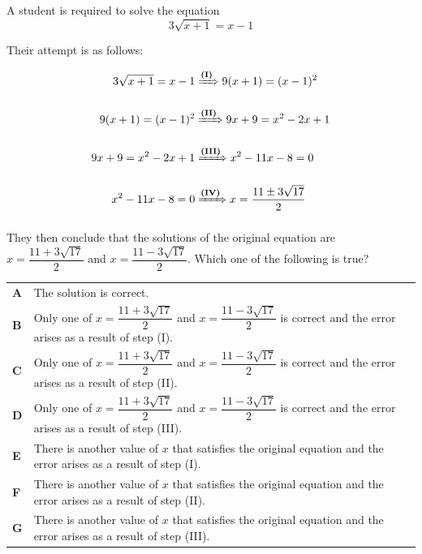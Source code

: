 \documentclass[11pt,a4paper]{article}
\begin{document}
\begin{enumerate}[label=\textbf{\arabic*.},leftmargin=*,itemsep=0pt,start=4]
\questionitem[Algebra]
A student is required to solve the equation \[ 3\sqrt{x+1}=x-1 \]

Their attempt is as follows:

\[ \begin{aligned} 3\sqrt{x+1}=x-1 &\xRightarrow{\textbf{(I)}} 9(x+1)=(x-1)^2\\[10pt] 9(x+1)=(x-1)^2 &\xRightarrow{\textbf{(II)}} 9x+9=x^2-2x+1\\[10pt] 9x+9=x^2-2x+1 &\xRightarrow{\textbf{(III)}} x^2-11x-8=0\\[10pt] x^2-11x-8=0 &\xRightarrow{\textbf{(IV)}} x=\dfrac{11\pm 3\sqrt{17}}{2} \\[10pt] \end{aligned} \] They then conclude that the solutions of the original equation are $x=\dfrac{11+3\sqrt{17}}{2}$ and $x=\dfrac{11-3\sqrt{17}}{2}$. Which one of the following is true?

\par\vspace*{12pt}
\begin{tabularx}{\linewidth}{@{}>{\bfseries}l Y@{}}
A &
The solution is correct.
\\[0.8em]
B &
Only one of $x=\dfrac{11+3\sqrt{17}}{2}$ and $x=\dfrac{11-3\sqrt{17}}{2}$ is correct and the error arises as a result of step (I).
\\[0.8em]
C &
Only one of $x=\dfrac{11+3\sqrt{17}}{2}$ and $x=\dfrac{11-3\sqrt{17}}{2}$ is correct and the error arises as a result of step (II).
\\[0.8em]
D &
Only one of $x=\dfrac{11+3\sqrt{17}}{2}$ and $x=\dfrac{11-3\sqrt{17}}{2}$ is correct and the error arises as a result of step (III).
\\[0.8em]
E &
There is another value of $x$ that satisfies the original equation and the error arises as a result of step (I).
\\[0.8em]
F &
There is another value of $x$ that satisfies the original equation and the error arises as a result of step (II).
\\[0.8em]
G &
There is another value of $x$ that satisfies the original equation and the error arises as a result of step (III).
\\
\end{tabularx}


\end{enumerate}
\end{document}
